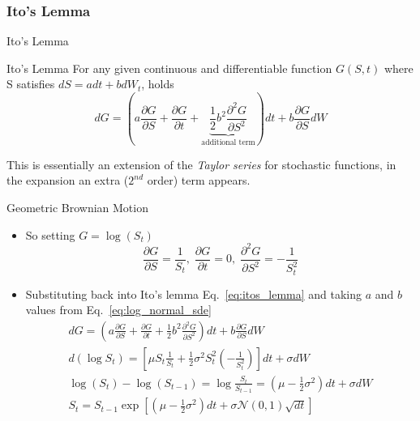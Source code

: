 \documentclass{beamer}
\begin{document}
\subsubsection{Ito's Lemma}
\begin{frame}{Ito's Lemma}
	\begin{block}{Ito's Lemma}
	For any given continuous and differentiable function $G(S,t)$ where S satisfies $dS=adt + bdW_t$, holds
	\begin{equation}
	dG = \left(a\frac{\partial G}{\partial S} + \frac{\partial G}{\partial t} + \underbrace{\frac{1}{2}b^2\frac{\partial^2 G}{\partial S^2}}_{\text{additional term}}\right)dt + b\frac{\partial G}{\partial S} dW
	\label{eq:itos_lemma}
	\end{equation}
	\end{block}

	This is essentially an extension of the \emph{Taylor series} for stochastic functions, in the expansion an extra ($2^{nd}$ order) term appears.
\end{frame}

\begin{frame}{Geometric Brownian Motion}
	\begin{itemize}
		\item So setting $G=\log(S_t)$ 
		\begin{equation*}
			\frac{\partial G}{\partial S}=\frac{1}{S_t},\;\frac{\partial G}{\partial t}=0,\;\frac{\partial^2 G}{\partial S^2}=-\frac{1}{S_t^2}
		\end{equation*}
		\item Substituting back into Ito's lemma Eq.~\ref{eq:itos_lemma} and taking $a$ and $b$ values from Eq.~\ref{eq:log_normal_sde}
		\begin{equation}
			\begin{gathered}
			dG = \left(a\frac{\partial G}{\partial S} + \frac{\partial G}{\partial t} + \frac{1}{2}b^2\frac{\partial^2 G}{\partial S^2}\right)dt + b\frac{\partial G}{\partial S} dW \\
			d(\log S_t) = \left[\mu S_t\frac{1}{S_t} + \frac{1}{2}\sigma^2S_t^2\left(-\frac{1}{S_t^2}\right)\right]dt + \sigma dW \\
			\log(S_t) - \log(S_{t-1}) = \log\frac{S_t}{S_{t-1}}=\left(\mu - \frac{1}{2}\sigma^2\right)dt + \sigma dW \\
			S_t = S_{t-1}\exp\left[\left(\mu-\frac{1}{2}\sigma^2\right)dt + \sigma\mathcal{N}(0,1)\sqrt{dt}\right] 
			\end{gathered}
		\end{equation}
	\end{itemize}
\end{frame}
\end{document}
